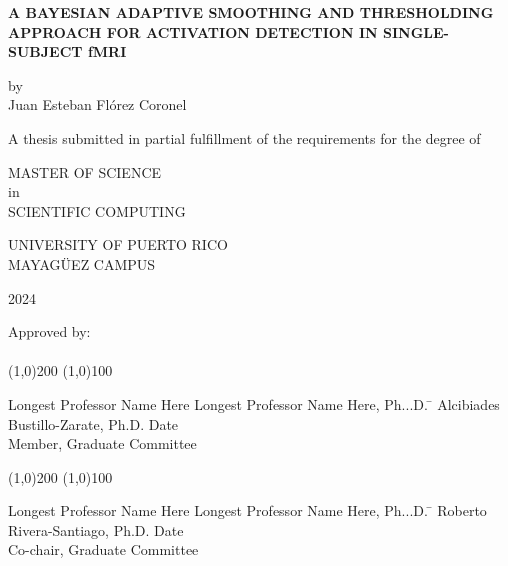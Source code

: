 
\thispagestyle{empty}
\begin{center}
\begin{singlespace}
\textbf{A BAYESIAN ADAPTIVE SMOOTHING AND THRESHOLDING APPROACH FOR ACTIVATION DETECTION IN SINGLE-SUBJECT fMRI}
\end{singlespace}
\vspace{4 mm}
by
\\
\vspace{4 mm}
Juan Esteban Flórez Coronel %
\vspace{4 mm}
\begin{singlespace}
A thesis submitted in partial fulfillment of the requirements for the degree of %
\end{singlespace}
\vspace{4 mm}
MASTER OF SCIENCE %
\\
in
\\
SCIENTIFIC COMPUTING %
\\
\vspace{4 mm}
\begin{singlespace}

UNIVERSITY OF PUERTO RICO
\\
MAYAGÜEZ CAMPUS
\end{singlespace}

2024 %
\end{center}
\bigskip
\bigskip
\bigskip
\bigskip
\bigskip
\bigskip
\bigskip

  \noindent Approved by:
\\
\\

  \noindent
\line(1,0){200} \hspace{40 mm} \line(1,0){100}\\
  \noindent
\vspace{-1.75\baselineskip}
  \begin{tabbing}
Longest Professor Name Here Longest Professor Name Here, Ph...D. \=  \kill 
Alcibiades Bustillo-Zarate, Ph.D. \>  Date\\Member, Graduate Committee  %
\end{tabbing}



  \noindent
\line(1,0){200} \hspace{40 mm} \line(1,0){100}\\
  \noindent
\vspace{-1.75\baselineskip}
  \begin{tabbing}
Longest Professor Name Here Longest Professor Name Here, Ph...D. \=  \kill 
Roberto Rivera-Santiago, Ph.D. \>  Date\\Co-chair, Graduate Committee  %
\end{tabbing}


